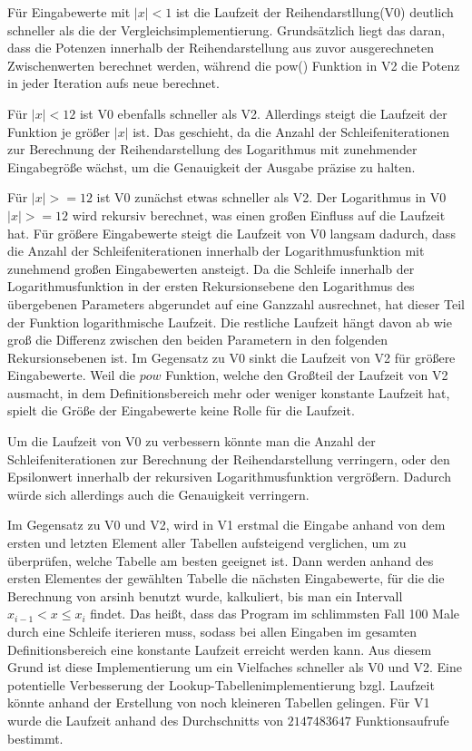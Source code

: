 \documentclass[course=erap]{aspdoc}
\begin{document}
Für Eingabewerte mit $|x|<1$ ist die Laufzeit der Reihendarstllung(V0) deutlich schneller als die der Vergleichsimplementierung. Grundsätzlich liegt das daran, dass die Potenzen innerhalb der Reihendarstellung aus zuvor ausgerechneten Zwischenwerten berechnet werden, während die pow()
Funktion in V2 die Potenz in jeder Iteration aufs neue berechnet.

Für $|x|<12$ ist V0  ebenfalls schneller als V2. Allerdings steigt die Laufzeit der Funktion je größer $|x|$ ist. Das geschieht, da die Anzahl der Schleifeniterationen zur Berechnung der Reihendarstellung
des Logarithmus mit zunehmender Eingabegröße wächst, um die Genauigkeit 
der Ausgabe präzise zu halten. 

Für $|x|>=12$ ist V0 zunächst etwas schneller als V2.  Der Logarithmus in V0 $|x|>=12$ wird rekursiv berechnet, was einen großen Einfluss auf die Laufzeit hat.  Für größere Eingabewerte steigt die Laufzeit von V0 langsam dadurch, dass die Anzahl der Schleifeniterationen innerhalb der Logarithmusfunktion mit zunehmend großen Eingabewerten ansteigt. Da die Schleife innerhalb der Logarithmusfunktion in der ersten Rekursionsebene den Logarithmus des übergebenen Parameters abgerundet auf eine Ganzzahl ausrechnet, hat dieser Teil der Funktion logarithmische Laufzeit. Die restliche Laufzeit hängt davon ab wie groß die Differenz zwischen den beiden Parametern in den folgenden Rekursionsebenen ist. Im Gegensatz zu V0 sinkt die Laufzeit von V2 für größere Eingabewerte. Weil die $pow$ Funktion, welche den Großteil der Laufzeit von V2 ausmacht, in dem Definitionsbereich mehr oder weniger konstante Laufzeit hat, spielt die Größe der Eingabewerte keine Rolle für die Laufzeit.

Um die Laufzeit von V0 zu verbessern könnte man die Anzahl der Schleifeniterationen zur Berechnung der Reihendarstellung verringern, oder den Epsilonwert innerhalb der rekursiven Logarithmusfunktion vergrößern. Dadurch würde sich allerdings auch die Genauigkeit verringern.

Im Gegensatz zu V0 und V2, wird in V1 erstmal die Eingabe anhand von dem ersten und letzten Element aller Tabellen aufsteigend verglichen, um zu überprüfen, welche Tabelle am besten geeignet ist. Dann werden anhand des ersten Elementes der gewählten Tabelle die nächsten Eingabewerte, für die die Berechnung von arsinh benutzt wurde, kalkuliert, bis man ein Intervall $x_{i-1} < x \leq{x_i}$ findet. Das heißt, dass das Program im schlimmsten Fall 100 Male durch eine Schleife iterieren muss, sodass bei allen Eingaben im gesamten Definitionsbereich eine konstante Laufzeit erreicht werden kann. Aus diesem Grund ist diese Implementierung um ein Vielfaches schneller als V0 und V2. Eine potentielle Verbesserung der Lookup-Tabellenimplementierung bzgl. Laufzeit könnte anhand der Erstellung von noch kleineren Tabellen gelingen. 
Für V1 wurde die Laufzeit anhand des Durchschnitts von $2147483647$ Funktionsaufrufe bestimmt.
\end{document}
